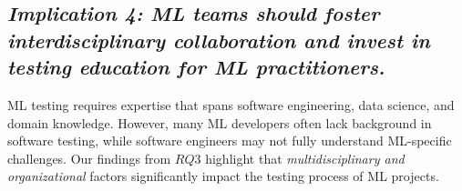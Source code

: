 


\subsection*{\textbf{\textit{Implication 4: ML teams should foster interdisciplinary collaboration and invest in testing education for ML practitioners.}}}

ML testing requires expertise that spans software engineering, data science, and domain knowledge. However, many ML developers often lack background in software testing, while software engineers may not fully understand ML-specific challenges. 
Our findings from $RQ3$ highlight that \textit{multidisciplinary and organizational} factors significantly impact the testing process of ML projects.

